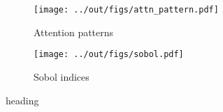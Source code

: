 \begin{figure}[t]
    \centering
    \begin{subfigure}[c]{0.5\textwidth}
        \texttt{[image: ../out/figs/attn\_pattern.pdf]}
        \caption{Attention patterns}
        \label{fig:attn-pattern}
    \end{subfigure}%
    \begin{subfigure}[c]{0.5\textwidth}
        \texttt{[image: ../out/figs/sobol.pdf]}
        \caption{Sobol indices}
        \label{fig:attn-sobol}
    \end{subfigure}
    \caption{heading}
    \label{fig:attn}
\end{figure}